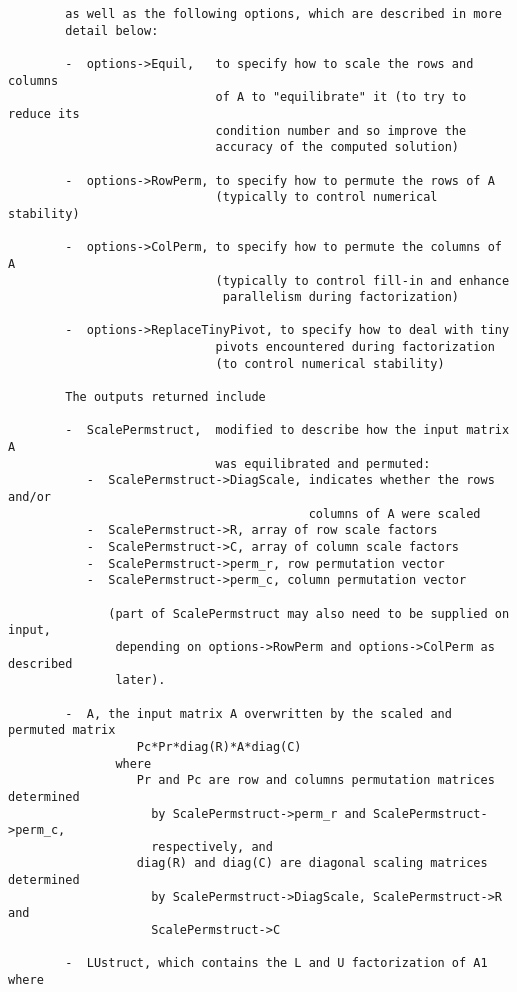 \begin{verbatim}
        as well as the following options, which are described in more 
        detail below:
  
        -  options->Equil,   to specify how to scale the rows and columns
                             of A to "equilibrate" it (to try to reduce its
                             condition number and so improve the
                             accuracy of the computed solution)
  
        -  options->RowPerm, to specify how to permute the rows of A
                             (typically to control numerical stability)
  
        -  options->ColPerm, to specify how to permute the columns of A
                             (typically to control fill-in and enhance
                              parallelism during factorization)
  
        -  options->ReplaceTinyPivot, to specify how to deal with tiny
                             pivots encountered during factorization
                             (to control numerical stability)
  
        The outputs returned include
           
        -  ScalePermstruct,  modified to describe how the input matrix A
                             was equilibrated and permuted:
           -  ScalePermstruct->DiagScale, indicates whether the rows and/or
                                          columns of A were scaled
           -  ScalePermstruct->R, array of row scale factors
           -  ScalePermstruct->C, array of column scale factors
           -  ScalePermstruct->perm_r, row permutation vector
           -  ScalePermstruct->perm_c, column permutation vector
  
              (part of ScalePermstruct may also need to be supplied on input,
               depending on options->RowPerm and options->ColPerm as described 
               later).
  
        -  A, the input matrix A overwritten by the scaled and permuted matrix
                  Pc*Pr*diag(R)*A*diag(C)
               where 
                  Pr and Pc are row and columns permutation matrices determined
                    by ScalePermstruct->perm_r and ScalePermstruct->perm_c, 
                    respectively, and 
                  diag(R) and diag(C) are diagonal scaling matrices determined
                    by ScalePermstruct->DiagScale, ScalePermstruct->R and 
                    ScalePermstruct->C
  
        -  LUstruct, which contains the L and U factorization of A1 where
  

\end{verbatim}
